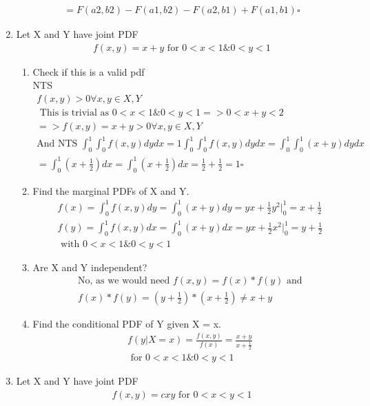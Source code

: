 \documentclass[11pt]{article}
\begin{document}
\begin{enumerate}
\begin{gather}
	= F(a2,b2)-F(a1,b2)-F(a2,b1)+F(a1,b1) \square
\end{gather}
\item Let X and Y have joint PDF
\begin{gather}
	f(x,y) = x+y \text{ for } 0<x<1 \& 0<y<1
\end{gather}
\begin{enumerate}
	\item Check if this is a valid pdf\\
	NTS
	\begin{gather}
		f(x,y)>0 \forall x,y \in X,Y \\
		\text{ This is trivial as } 0<x<1 \& 0<y<1 =>  0<x+y<2 \\
		=> f(x,y) = x+y >0 \forall x,y \in X,Y \\
		\text{And NTS } \int_{0}^{1}\int_{0}^{1}f(x,y)dydx = 1
		\int_{0}^{1}\int_{0}^{1}f(x,y)dydx = 	\int_{0}^{1}\int_{0}^{1} (x+ y)dydx \\
		= \int_{0}^{1}(x+\frac{1}{2})dx = \int_{0}^{1}(x+\frac{1}{2})dx = \frac{1}{2} + \frac{1}{2} = 1 \square
	\end{gather}
	\item Find the marginal PDFs of X and Y.
	\begin{gather}
		f(x) = \int_{0}^{1}f(x,y)dy = \int_{0}^{1}(x+ y)dy  = yx + \frac{1}{2}y^2 \big|_0^1 = x+\frac{1}{2}\\
		f(y) = \int_{0}^{1}f(x,y)dx = \int_{0}^{1}(x+ y)dx  = yx + \frac{1}{2}x^2 \big|_0^1 = y+\frac{1}{2}\\
		\text{ with } 0<x<1 \& 0<y<1
	\end{gather}
	\item Are X and Y independent?
	\begin{gather}
		\text{No, as we would need }f(x,y) = f(x)*f(y) \text{ and}\\
		f(x)*f(y) = (y+\frac{1}{2}) *  (x+\frac{1}{2}) \ne x+y
	\end{gather}
	\item  Find the conditional PDF of Y given X = x.
	\begin{gather}
		f(y|X=x) = \frac{f(x,y)}{f(x)} = \frac{x+y}{x+\frac{1}{2}}\\
		\text{ for } 0<x<1 \& 0<y<1
	\end{gather}
\end{enumerate}
\item Let X and Y have joint PDF
\begin{gather}
	f(x,y) = cxy \text{ for } 0<x<y<1
\end{gather}

\end{enumerate}
\end{document}
